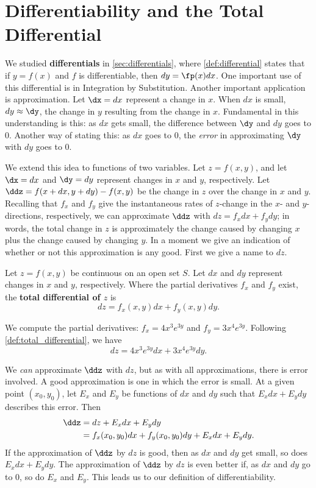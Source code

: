\section{Differentiability and the Total Differential}\label{sec:total_differential}

We studied  \textbf{differentials} in \autoref{sec:differentials}, where \autoref{def:differential}  states that if $y=f(x)$ and $f$ is differentiable, then $dy=\fp(x)dx$. One important use of this differential is in Integration by Substitution. Another important application is approximation. Let $\dx = dx$ represent a change in $x$. When $dx$ is small, $dy\approx \dy$, the change in $y$ resulting from the change in $x$. Fundamental in this understanding is this: as $dx$ gets small, the difference between $\dy$ and $dy$ goes to 0. Another way of stating this: as $dx$ goes to 0, the \textit{error} in approximating $\dy$ with $dy$ goes to 0.

We extend this idea to functions of two variables. Let $z=f(x,y)$, and let $\dx = dx$ and $\dy=dy$ represent changes in $x$ and $y$, respectively. Let $\ddz = f(x+dx,y+dy) - f(x,y)$ be the change in $z$ over the change in $x$ and $y$. Recalling that $f_x$ and $f_y$ give the instantaneous rates of $z$-change in the $x$- and $y$-directions, respectively, we can approximate $\ddz$ with $dz = f_xdx+f_ydy$; in words, the total change in $z$ is approximately the change caused by changing $x$ plus the change caused by changing $y$. In a moment we give an indication of whether or not this approximation is any good. First we give a name to $dz$.

{Let $z=f(x,y)$ be continuous on an open set $S$. Let $dx$ and $dy$ represent changes in $x$ and $y$, respectively. Where the partial derivatives $f_x$ and $f_y$ exist, the \textbf{total differential of $z$} is 
$$dz = f_x(x,y)dx + f_y(x,y)dy.$$
}

{We compute the partial derivatives: $f_x = 4x^3e^{3y}$ and $f_y = 3x^4e^{3y}$. Following \autoref{def:total_differential}, we have
$$dz = 4x^3e^{3y}dx+3x^4e^{3y}dy.$$}

We \textit{can} approximate $\ddz$ with $dz$, but as with all approximations, there is error involved. A good approximation is one in which the error is small. At a given point $(x_0,y_0)$, let $E_x$ and $E_y$ be functions of $dx$ and $dy$ such that $E_xdx+E_ydy$ describes this error. Then
\begin{align*}
\ddz &= dz + E_xdx+ E_ydy \\
		&= f_x(x_0,y_0)dx+f_y(x_0,y_0)dy + E_xdx+E_ydy.
\end{align*}
If the approximation of $\ddz$ by $dz$ is good, then as $dx$ and $dy$ get small,  so does $E_xdx+E_ydy$. The approximation of $\ddz$ by $dz$ is even better if, as $dx$ and $dy$ go to 0, so do $E_x$ and $E_y$. This leads us to our definition of differentiability.

